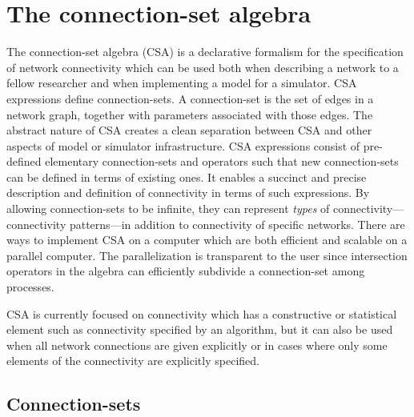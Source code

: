 \documentclass{frontiersSCNS} %
\begin{document}
\section{The connection-set algebra}\label{sec:csa}


The connection-set algebra (CSA) is a declarative formalism for the
specification of network connectivity which can be used both when
describing a network to a fellow researcher and when implementing a
model for a simulator. CSA expressions define connection-sets. A
connection-set is the set of edges in a network graph, together with
parameters associated with those edges. The abstract nature of CSA
creates a clean separation between CSA and other aspects of model or
simulator infrastructure.  CSA expressions consist of pre-defined
elementary connection-sets and operators such that new connection-sets
can be defined in terms of existing ones. It enables a succinct and
precise description and definition of connectivity in terms of such
expressions. By allowing connection-sets to be infinite, they can
represent \emph{types} of connectivity---connectivity patterns---in
addition to connectivity of specific networks. There are ways to
implement CSA on a computer which are both efficient and scalable on a
parallel computer. The parallelization is transparent to the user
since intersection operators in the algebra can efficiently subdivide
a connection-set among processes.

CSA is currently focused on connectivity which has a constructive or
statistical element such as connectivity specified by an algorithm,
but it can also be used when all network connections are given
explicitly or in cases where only some elements of the connectivity
are explicitly specified.

\subsection{Connection-sets}
\end{document}
